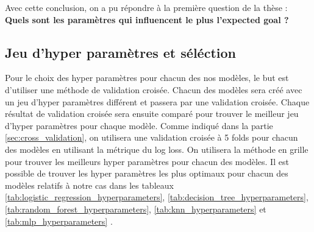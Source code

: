 \documentclass[12pt]{article}
\begin{document}
Avec cette conclusion, on a pu répondre à la première question de la thèse : \newline\textbf{Quels sont les paramètres qui influencent le plus l’expected goal ?}


\subsection{Jeu d'hyper paramètres et séléction}
Pour le choix des hyper paramètres pour chacun des nos modèles, le but est d'utiliser une méthode de validation croisée.
Chacun des modèles sera créé avec un jeu d'hyper paramètres différent et passera par une validation croisée.
Chaque résultat de validation croisée sera ensuite comparé pour trouver le meilleur jeu d'hyper paramètres pour chaque modèle.
Comme indiqué dans la partie \ref{sec:cross_validation}, on utilisera une validation croisée à 5 folds pour chacun des modèles en utilisant la métrique du log loss.
On utilisera la méthode en grille pour trouver les meilleurs hyper paramètres pour chacun des modèles.
Il est possible de trouver les hyper paramètres les plus optimaux pour chacun des modèles relatifs à notre cas dans les tableaux \ref{tab:logistic_regression_hyperparameters}, \ref{tab:decision_tree_hyperparameters}, \ref{tab:random_forest_hyperparameters}, \ref{tab:knn_hyperparameters} et \ref{tab:mlp_hyperparameters} .
\end{document}
